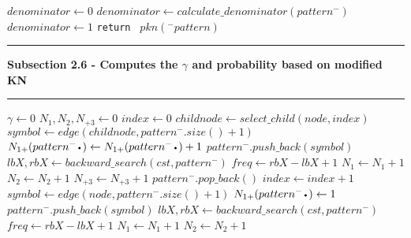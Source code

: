 \documentclass[11pt]{article}
\newcommand\Algphase[1]{%
\vspace*{-.7\baselineskip}\Statex\hspace*{\dimexpr-\algorithmicindent-2pt\relax}\rule{\textwidth}{0.1pt}%
\Statex\hspace*{-\algorithmicindent}\textbf{#1}%
\vspace*{-.7\baselineskip}\Statex\hspace*{\dimexpr-\algorithmicindent-2pt\relax}\rule{\textwidth}{0.1pt}%
}
\newcommand*{\LargerCdot}{\raisebox{-0.75ex}{\scalebox{2}{$\cdot$}}}
\begin{document}
\begin{algorithm*}\footnotesize
\begin{algorithmic}
    \vspace{2mm}
    \State $denominator\gets 0$
        \State $denominator\gets calculate\_denominator(pattern^{-})$
        \State $denominator \gets 1$
    \EndIf
		\State \texttt{return } $pkn(^{-}pattern)$
	\EndIf
    \Algphase{ Subsection 2.6 - Computes the $\gamma$ and probability based on modified KN}

	    \State $\gamma\gets 0$
	    \State $N_1,N_2,N_{+3}\gets 0$
	        \State $index\gets 0$
			    \State $childnode\gets select\_child(node,index)$
			    \State $symbol\gets edge(childnode,pattern^{-}.size()+1)$
				    \State $N_{1+}(pattern^{-}\LargerCdot)\gets N_{1+}(pattern^{-}\LargerCdot)+1$
			            \State $pattern^{-}.push\_back(symbol)$                       			                 					    \State $lbX, rbX\gets backward\_search(cst,pattern^{-})$
					    \State $freq\gets rbX-lbX+1$
					        \State $N_1\gets N_1 + 1$
		    			    \State $N_2\gets N_2 + 1$
				    	     \State $N_{+3}\gets N_{+3} + 1$
					    \EndIf
					    \State $pattern^{-}.pop\_back()$
       			    \EndIf
				    \State $index\gets index+1$
				\EndIf
		    \EndWhile
		\Else
		    \State $symbol\gets edge(node,pattern^{-}.size()+1)$
                \State $N_{1+}(pattern^{-}\LargerCdot)\gets 1$
            	    \State $pattern^{-}.push\_back(symbol)$                                                       
                    \State $lbX, rbX\gets backward\_search(cst,pattern^{-})$
                    \State $freq\gets rbX-lbX+1$
                        \State $N_1\gets N_1 + 1$
                    	\State $N_2\gets N_2 + 1$

\end{algorithmic}
\end{algorithm*}
\end{document}
